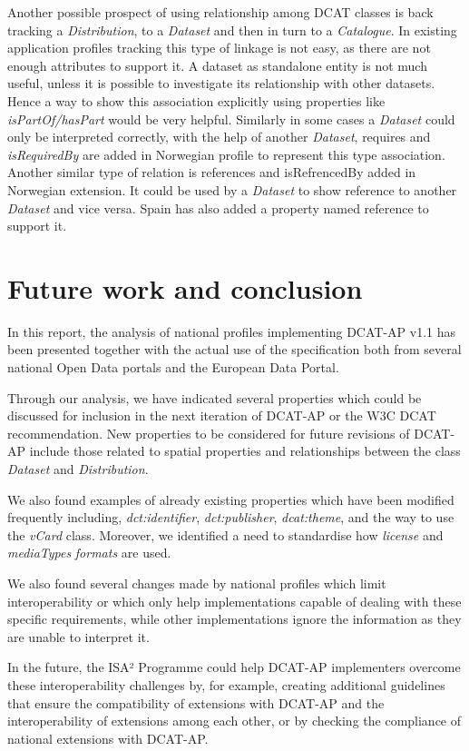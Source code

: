 \documentclass[<options>]{elsarticle}
\begin{document}
Another possible prospect of using relationship among DCAT classes is back tracking a \textit{Distribution}, to a \textit{Dataset} and then in turn to a \textit{Catalogue}. In existing application profiles tracking this type of linkage is not easy, as there are not enough attributes to support it. A dataset as standalone entity is not much useful, unless it is possible to investigate its relationship with other datasets. Hence a way to show this association explicitly using properties like \textit{isPartOf/hasPart }would be very helpful. Similarly in some cases a \textit{Dataset} could only be interpreted correctly, with the help of another \textit{Dataset}, requires and \textit{isRequiredBy} are added in Norwegian profile to represent this type association. Another similar type of relation is references and isRefrencedBy added in Norwegian extension. It could be used by a \textit{Dataset} to show reference to another \textit{Dataset} and vice versa. Spain has also added a property named reference to support it.


\section{Future work and conclusion}
In this report, the analysis of national profiles implementing DCAT-AP v1.1 has been presented together with the actual use of the specification both from several national Open Data portals and the European Data Portal. 

Through our analysis, we have indicated several properties which could be discussed for inclusion in the next iteration of DCAT-AP or the W3C DCAT recommendation. New properties to be considered for future revisions of DCAT-AP include those related to spatial properties and relationships between the class \textit{Dataset} and \textit{Distribution}.

We also found examples of already existing properties which have been modified frequently including, \textit{dct:identifier}, \textit{dct:publisher}, \textit{dcat:theme}, and the way to use the \textit{vCard }class. Moreover, we identified a need to standardise how \textit{license} and \textit{mediaTypes} \textit{formats }are used. 

We also found several changes made by national profiles which limit interoperability or which only help implementations capable of dealing with these specific requirements, while other implementations ignore the information as they are unable to interpret it. 

In the future, the ISA² Programme could help DCAT-AP implementers overcome these interoperability challenges by, for example, creating additional guidelines that ensure the compatibility of extensions with DCAT-AP and the interoperability of extensions among each other, or by checking the compliance of national extensions with DCAT-AP.
\end{document}
